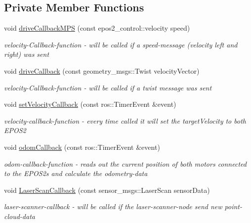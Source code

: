 \subsection*{Private Member Functions}
\begin{DoxyCompactItemize}
\item 
void \hyperlink{classTankSteering_a1ee9bb43163695018d65f8dbda46c050}{drive\-Callback\-M\-P\-S} (const epos2\-\_\-control\-::velocity speed)
\begin{DoxyCompactList}\small\item\em velocity-\/\-Callback-\/function -\/ will be called if a speed-\/message (velocity left and right) was sent \end{DoxyCompactList}\item 
void \hyperlink{classTankSteering_a7d071ca7df1b04000275255114d9ff63}{drive\-Callback} (const geometry\-\_\-msgs\-::\-Twist velocity\-Vector)
\begin{DoxyCompactList}\small\item\em velocity-\/\-Callback-\/function -\/ will be called if a twist message was sent \end{DoxyCompactList}\item 
void \hyperlink{classTankSteering_ab1335cf95b773d0b8908d74ebb61c289}{set\-Velocity\-Callback} (const ros\-::\-Timer\-Event \&event)
\begin{DoxyCompactList}\small\item\em velocity-\/callback-\/function -\/ every time called it will set the target\-Velocity to both E\-P\-O\-S2 \end{DoxyCompactList}\item 
void \hyperlink{classTankSteering_ae19dbe86e3ae541c06525af2721a37dd}{odom\-Callback} (const ros\-::\-Timer\-Event \&event)
\begin{DoxyCompactList}\small\item\em odom-\/callback-\/function -\/ reads out the current position of both motors connected to the E\-P\-O\-S2s and calculate the odometry-\/data \end{DoxyCompactList}\item 
void \hyperlink{classTankSteering_a724c44b283936129841b91ecdcdb6235}{Laser\-Scan\-Callback} (const sensor\-\_\-msgs\-::\-Laser\-Scan sensor\-Data)
\begin{DoxyCompactList}\small\item\em laser-\/scanner-\/callback -\/ will be called if the laser-\/scanner-\/node send new point-\/cloud-\/data \end{DoxyCompactList}\item 

\end{DoxyCompactItemize}
